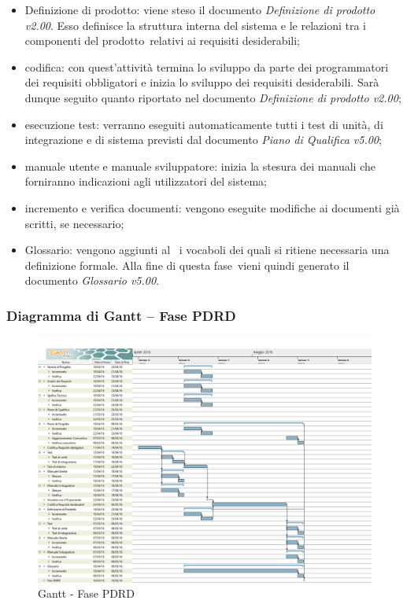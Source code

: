 \documentclass[../PianoProgetto.tex]{subfiles}
\begin{document}
		\begin{itemize}
			\item Definizione di prodotto: viene steso il documento \textit{Definizione di prodotto v2.00}. Esso definisce la struttura interna del sistema e le relazioni tra i componenti del prodotto\g\ relativi ai requisiti desiderabili;

			\item codifica: con quest'attività termina lo sviluppo da parte dei programmatori dei requisiti obbligatori e inizia lo sviluppo dei requisiti desiderabili. Sarà dunque seguito quanto riportato nel documento \textit{Definizione di prodotto v2.00};

	 		\item esecuzione test: verranno eseguiti automaticamente tutti i test di unità, di integrazione e di sistema previsti dal documento \textit{Piano di Qualifica v5.00};

			\item manuale utente e manuale sviluppatore: inizia la stesura dei manuali che forniranno indicazioni agli utilizzatori del sistema;

			\item incremento e verifica documenti: vengono eseguite modifiche ai documenti già scritti, se necessario;

			\item Glossario: vengono aggiunti al \glossario\ i vocaboli dei quali si ritiene necessaria una definizione formale. Alla fine di questa fase\g\ vieni quindi generato il documento \textit{Glossario v5.00}.
		\end{itemize}
		\newpage
		\subsubsection{Diagramma di Gantt – Fase PDRD}
			\begin{figure}[!h]
				\centering
				\includegraphics[width=\textwidth]{gantt_png/5-requisiti_desiderabili}
				\caption{Gantt - Fase PDRD}
				\label{fig:Gantt - Fase PDRD}
			\end{figure}
			
\end{document}
